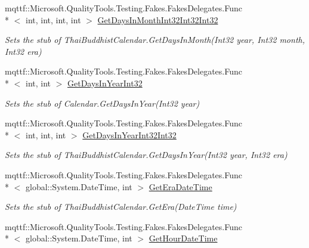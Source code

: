 \begin{DoxyCompactItemize}
mqttf\-::\-Microsoft.\-Quality\-Tools.\-Testing.\-Fakes.\-Fakes\-Delegates.\-Func\\*
$<$ int, int, int, int $>$ \hyperlink{class_system_1_1_globalization_1_1_fakes_1_1_stub_thai_buddhist_calendar_a06de4ed4a7f9992762c0f251964657f3}{Get\-Days\-In\-Month\-Int32\-Int32\-Int32}
\begin{DoxyCompactList}\small\item\em Sets the stub of Thai\-Buddhist\-Calendar.\-Get\-Days\-In\-Month(\-Int32 year, Int32 month, Int32 era)\end{DoxyCompactList}\item 
mqttf\-::\-Microsoft.\-Quality\-Tools.\-Testing.\-Fakes.\-Fakes\-Delegates.\-Func\\*
$<$ int, int $>$ \hyperlink{class_system_1_1_globalization_1_1_fakes_1_1_stub_thai_buddhist_calendar_ad4f81e51eeda04ca2c4796e619d77c5b}{Get\-Days\-In\-Year\-Int32}
\begin{DoxyCompactList}\small\item\em Sets the stub of Calendar.\-Get\-Days\-In\-Year(\-Int32 year)\end{DoxyCompactList}\item 
mqttf\-::\-Microsoft.\-Quality\-Tools.\-Testing.\-Fakes.\-Fakes\-Delegates.\-Func\\*
$<$ int, int, int $>$ \hyperlink{class_system_1_1_globalization_1_1_fakes_1_1_stub_thai_buddhist_calendar_a97b2be2ad1f2102330391e0ada7681e6}{Get\-Days\-In\-Year\-Int32\-Int32}
\begin{DoxyCompactList}\small\item\em Sets the stub of Thai\-Buddhist\-Calendar.\-Get\-Days\-In\-Year(\-Int32 year, Int32 era)\end{DoxyCompactList}\item 
mqttf\-::\-Microsoft.\-Quality\-Tools.\-Testing.\-Fakes.\-Fakes\-Delegates.\-Func\\*
$<$ global\-::\-System.\-Date\-Time, int $>$ \hyperlink{class_system_1_1_globalization_1_1_fakes_1_1_stub_thai_buddhist_calendar_ac74bd450c5b6eb6b266fd083fab3e459}{Get\-Era\-Date\-Time}
\begin{DoxyCompactList}\small\item\em Sets the stub of Thai\-Buddhist\-Calendar.\-Get\-Era(\-Date\-Time time)\end{DoxyCompactList}\item 
mqttf\-::\-Microsoft.\-Quality\-Tools.\-Testing.\-Fakes.\-Fakes\-Delegates.\-Func\\*
$<$ global\-::\-System.\-Date\-Time, int $>$ \hyperlink{class_system_1_1_globalization_1_1_fakes_1_1_stub_thai_buddhist_calendar_a64b8afc35e441c9c16c31e3b0f57c4fb}{Get\-Hour\-Date\-Time}

\end{DoxyCompactItemize}

